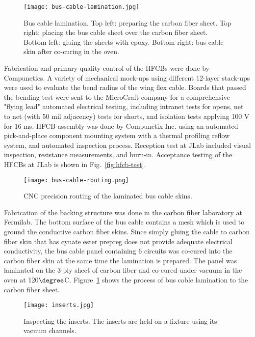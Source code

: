 \begin{figure}[h] 
\centering 
\texttt{[image: bus-cable-lamination.jpg]}
\caption{Bus cable lamination. Top left: preparing the carbon fiber sheet. Top right: placing the bus cable sheet over the carbon fiber sheet. Bottom left: gluing the sheets with epoxy. Bottom right: bus cable skin after co-curing in the oven.}
\label{fig:bus-cable-lamination}
\end{figure}

Fabrication and primary quality control of the HFCBs were done by Compunetics. A variety of mechanical mock-ups using different 12-layer stack-ups were used to evaluate the bend radius of the wing flex cable. Boards that passed the bending test were sent to the MicroCraft company for a comprehensive "flying lead" automated electrical testing, including intranet tests for opens, net to net (with 50 mil adjacency) tests for shorts, and isolation tests applying 100 V for 16 ms. HFCB assembly was done by Compunetix Inc. using an automated pick-and-place component mounting system with a thermal profiling reflow system, and automated inspection process. Reception test at JLab included visual inspection, resistance measurements, and burn-in. Acceptance testing of the HFCBs at JLab is shown in Fig.~\ref{fig:hfcb-test}. 

\begin{figure}[h] 
\centering 
\texttt{[image: bus-cable-routing.png]}
\caption{CNC precision routing of the laminated bus cable skins.}
\label{fig:bus-cable-routing}
\end{figure}

Fabrication of the backing structure was done in the carbon fiber laboratory at Fermilab. The bottom surface of the bus cable contains a mesh which is used to ground the conductive carbon fiber skins. Since simply gluing the cable to carbon fiber skin that has cynate ester prepreg does not provide adequate electrical conductivity, the bus cable panel containing 6 circuits was co-cured into the carbon fiber skin at the same time the lamination is prepared.   The panel was laminated on the 3-ply sheet of carbon fiber and co-cured under vacuum in the oven at 120$\degree$C. Figure~\ref{fig:bus-cable-lamination} shows the process of bus cable lamination to the carbon fiber sheet.

\begin{figure}[h] 
\centering 
\texttt{[image: inserts.jpg]}
\caption{Inspecting the inserts. The inserts are held on a fixture using its vacuum channels.}
\label{fig:inserts}
\end{figure}


